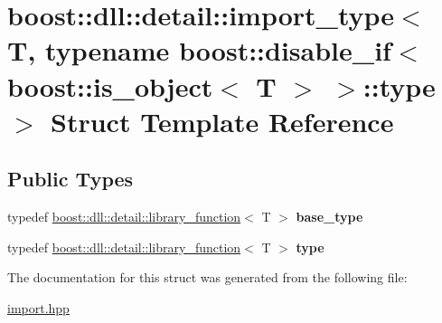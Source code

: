 \hypertarget{a01640}{}\section{boost\+:\+:dll\+:\+:detail\+:\+:import\+\_\+type$<$ T, typename boost\+:\+:disable\+\_\+if$<$ boost\+:\+:is\+\_\+object$<$ T $>$ $>$\+:\+:type $>$ Struct Template Reference}
\label{a01640}
\subsection*{Public Types}
\begin{DoxyCompactItemize}
\item 
\mbox{\label{a01640_ac512d41edc93b7e364f66977cc1d51cd}} 
typedef \hyperlink{a01632}{boost\+::dll\+::detail\+::library\+\_\+function}$<$ T $>$ {\bfseries base\+\_\+type}
\item 
\mbox{\label{a01640_af0795ef78ae101e0b7f77a18381262e4}} 
typedef \hyperlink{a01632}{boost\+::dll\+::detail\+::library\+\_\+function}$<$ T $>$ {\bfseries type}
\end{DoxyCompactItemize}


The documentation for this struct was generated from the following file\+:\begin{DoxyCompactItemize}
\item 
\hyperlink{a00254}{import.\+hpp}\end{DoxyCompactItemize}
